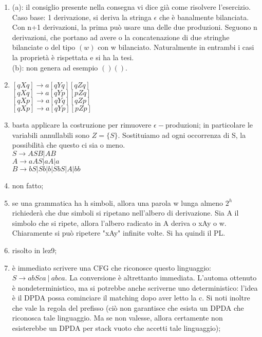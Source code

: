 \documentclass[a4paper,11pt]{article}
\begin{document}
\begin{enumerate}
    \item (a): il consiglio presente nella consegna vi dice già come risolvere l'esercizio. Caso base: 1 derivazione, si deriva la stringa $\epsilon$ che è banalmente bilanciata. Con n+1 derivazioni, la prima può usare una delle due produzioni. Seguono n derivazioni, che portano ad avere o la concatenazione di due stringhe bilanciate o del tipo $(w)$ con w bilanciato. Naturalmente in entrambi i casi la proprietà è rispettata e si ha la tesi.
    \\(b): non genera ad esempio $()()$.
    \item \begin{minipage}{\linewidth}
        $[qXq] \rightarrow a[qYq][qZq]$\\
        $[qXq] \rightarrow a[qYp][pZq]$\\
        $[qXp] \rightarrow a[qYq][qZp]$\\
        $[qXp] \rightarrow a[qYp][pZp]$\\
    \end{minipage}
    \item basta applicare la costruzione per rimuovere $\epsilon -$produzioni; in particolare le variabili annullabili sono $Z=\{S\}$. Sostituiamo ad ogni occorrenza di S, la possibilità che questo ci sia o meno.\\
    $S\rightarrow ASB|AB$\\
    $A\rightarrow aAS|aA|a$\\
    $B\rightarrow bS|Sb|b|SbS|A|bb$\\
    \item non fatto;
    \item se una grammatica ha h simboli, allora una parola w lunga almeno $2^h$ richiederà che due simboli si ripetano nell'albero di derivazione. Sia A il simbolo che si ripete, allora l'albero radicato in A deriva o xAy o w. Chiaramente si può ripetere "xAy" infinite volte. Si ha quindi il PL.
     \item risolto in lez9;
     \item è immediato scrivere una CFG che riconosce questo linguaggio: $S \rightarrow abSca\ |\ abca$. La conversione è altrettanto immediata. L'automa ottenuto è nondeterministico, ma si potrebbe anche scriverne uno deterministico: l'idea è  il DPDA possa cominciare il matching dopo aver letto la c. Si noti inoltre che vale la regola del prefisso (ciò non garantisce che esista un DPDA che riconosca tale linguaggio. Ma se non valesse, allora certamente non esisterebbe un DPDA per stack vuoto che accetti tale linguaggio);

\end{enumerate}
\end{document}
